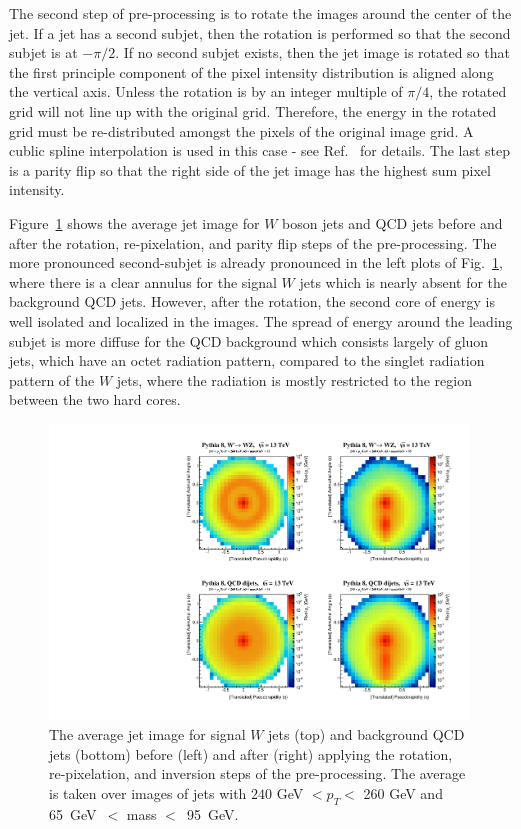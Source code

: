 The second step of pre-processing is to rotate the images around the center of the jet.  If a jet has a second subjet, then the rotation is performed so that the second subjet is at $-\pi/2$.  If no second subjet exists, then the jet image is rotated so that the first principle component of the pixel intensity distribution is aligned along the vertical axis.  Unless the rotation is by an integer multiple of $\pi/4$, the rotated grid will not line up with the original grid.  Therefore, the energy in the rotated grid must be re-distributed amongst the pixels of the original image grid.  A cublic spline interpolation is used in this case - see Ref.~\cite{Cogan:2014oua} for details.  The last step is a parity flip so that the right side of the jet image has the highest sum pixel intensity.  

Figure~\ref{fig:preprocess} shows the average jet image for $W$ boson jets and QCD jets before and after the rotation, re-pixelation, and parity flip steps of the pre-processing.  The more pronounced second-subjet is already pronounced in the left plots of Fig.~\ref{fig:preprocess}, where there is a clear annulus for the signal $W$ jets which is nearly absent for the background QCD jets.  However, after the rotation, the second core of energy is well isolated and localized in the images.  The spread of energy around the leading subjet is more diffuse for the QCD background which consists largely of gluon jets, which have an octet radiation pattern, compared to the singlet radiation pattern of the $W$ jets, where the radiation is mostly restricted to the region between the two hard cores.

\begin{figure}[htbp!]
  \begin{center}
        \includegraphics[width=0.99\textwidth]{figures/Image_mass_average_fixed_nonorm.pdf}
      \caption{ The average jet image for signal $W$ jets (top) and background QCD jets (bottom) before (left) and after (right) applying the rotation, re-pixelation, and inversion steps of the pre-processing.  The average is taken over images of jets with $240$ GeV $<p_T<$ 260 GeV and 65~GeV~$<$ mass $<$~95~GeV.
      \label{fig:preprocess} }
    \end{center}
\end{figure}

